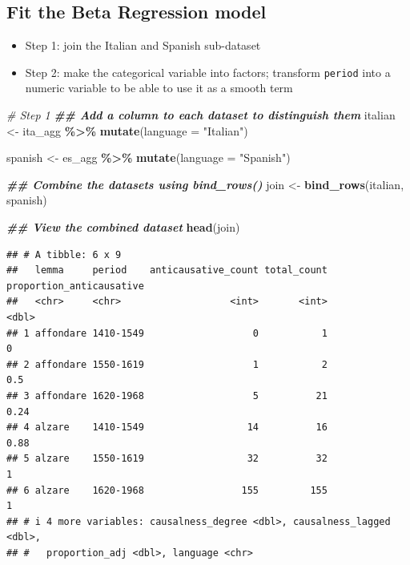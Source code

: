 \documentclass[
]{article}
\newenvironment{Shaded}{\begin{snugshade}}{\end{snugshade}}
\newcommand{\AttributeTok}[1]{\textcolor[rgb]{0.13,0.29,0.53}{#1}}
\newcommand{\CommentTok}[1]{\textcolor[rgb]{0.56,0.35,0.01}{\textit{#1}}}
\newcommand{\DocumentationTok}[1]{\textcolor[rgb]{0.56,0.35,0.01}{\textbf{\textit{#1}}}}
\newcommand{\FunctionTok}[1]{\textcolor[rgb]{0.13,0.29,0.53}{\textbf{#1}}}
\newcommand{\NormalTok}[1]{#1}
\newcommand{\OtherTok}[1]{\textcolor[rgb]{0.56,0.35,0.01}{#1}}
\newcommand{\SpecialCharTok}[1]{\textcolor[rgb]{0.81,0.36,0.00}{\textbf{#1}}}
\newcommand{\StringTok}[1]{\textcolor[rgb]{0.31,0.60,0.02}{#1}}
\providecommand{\tightlist}{%
  \setlength{\itemsep}{0pt}\setlength{\parskip}{0pt}}
\begin{document}
\subsection{Fit the Beta Regression
model}\label{fit-the-beta-regression-model}

\begin{itemize}
\tightlist
\item
  Step 1: join the Italian and Spanish sub-dataset
\item
  Step 2: make the categorical variable into factors; transform
  \texttt{period} into a numeric variable to be able to use it as a
  smooth term
\end{itemize}

\begin{Shaded}
\begin{Highlighting}[]
\CommentTok{\# Step 1}
\DocumentationTok{\#\# Add a column to each dataset to distinguish them}
\NormalTok{italian }\OtherTok{\textless{}{-}}\NormalTok{ ita\_agg }\SpecialCharTok{\%\textgreater{}\%}
  \FunctionTok{mutate}\NormalTok{(}\AttributeTok{language =} \StringTok{"Italian"}\NormalTok{)}

\NormalTok{spanish }\OtherTok{\textless{}{-}}\NormalTok{ es\_agg }\SpecialCharTok{\%\textgreater{}\%}
  \FunctionTok{mutate}\NormalTok{(}\AttributeTok{language =} \StringTok{"Spanish"}\NormalTok{)}

\DocumentationTok{\#\# Combine the datasets using bind\_rows()}
\NormalTok{join }\OtherTok{\textless{}{-}} \FunctionTok{bind\_rows}\NormalTok{(italian, spanish)}

\DocumentationTok{\#\# View the combined dataset}
\FunctionTok{head}\NormalTok{(join)}
\end{Highlighting}
\end{Shaded}

\begin{verbatim}
## # A tibble: 6 x 9
##   lemma     period    anticausative_count total_count proportion_anticausative
##   <chr>     <chr>                   <int>       <int>                    <dbl>
## 1 affondare 1410-1549                   0           1                     0   
## 2 affondare 1550-1619                   1           2                     0.5 
## 3 affondare 1620-1968                   5          21                     0.24
## 4 alzare    1410-1549                  14          16                     0.88
## 5 alzare    1550-1619                  32          32                     1   
## 6 alzare    1620-1968                 155         155                     1   
## # i 4 more variables: causalness_degree <dbl>, causalness_lagged <dbl>,
## #   proportion_adj <dbl>, language <chr>
\end{verbatim}
\end{document}
